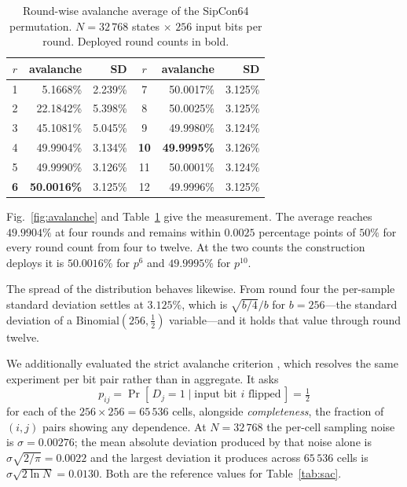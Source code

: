 \begin{table}[!t]
\centering
\caption{Round-wise avalanche average of the SipCon64 permutation.
$N = 32\,768$ states $\times$ $256$ input bits per round. Deployed round counts
in bold.}
\label{tab:avalanche}
\small
\begin{tabular}{crr@{\qquad}crr}
\hline
$r$ & avalanche & SD & $r$ & avalanche & SD\\
\hline
1 & 5.1668\% & 2.239\% & 7 & 50.0017\% & 3.125\%\\
2 & 22.1842\% & 5.398\% & 8 & 50.0025\% & 3.125\%\\
3 & 45.1081\% & 5.045\% & 9 & 49.9980\% & 3.124\%\\
4 & 49.9904\% & 3.134\% & \textbf{10} & \textbf{49.9995\%} & 3.126\%\\
5 & 49.9990\% & 3.126\% & 11 & 50.0001\% & 3.124\%\\
\textbf{6} & \textbf{50.0016\%} & 3.125\% & 12 & 49.9996\% & 3.125\%\\
\hline
\end{tabular}
\end{table}

Fig.~\ref{fig:avalanche} and Table~\ref{tab:avalanche} give the measurement.
The average reaches $49.9904\%$ at four rounds and remains within $0.0025$
percentage points of $50\%$ for every round count from four to twelve. At the
two counts the construction deploys it is $50.0016\%$ for $p^{6}$ and
$49.9995\%$ for $p^{10}$.

The spread of the distribution behaves likewise. From round four the
per-sample standard deviation settles at $3.125\%$, which is
$\sqrt{b/4}/b$ for $b = 256$---the standard deviation of a
$\mathrm{Binomial}(256, \tfrac{1}{2})$ variable---and it holds that value
through round twelve.

We additionally evaluated the strict avalanche criterion \cite{sac}, which
resolves the same experiment per bit pair rather than in aggregate. It asks
\begin{equation}
p_{ij} = \Pr[\,D_{j} = 1 \mid \text{input bit } i \text{ flipped}\,]
       = \tfrac{1}{2}
\label{eq:sac}
\end{equation}
for each of the $256 \times 256 = 65\,536$ cells, alongside
\emph{completeness}, the fraction of $(i,j)$ pairs showing any dependence. At
$N = 32\,768$ the per-cell sampling noise is $\sigma = 0.00276$; the mean
absolute deviation produced by that noise alone is $\sigma\sqrt{2/\pi} =
0.0022$ and the largest deviation it produces across $65\,536$ cells is
$\sigma\sqrt{2\ln N} = 0.0130$. Both are the reference values for
Table~\ref{tab:sac}.

